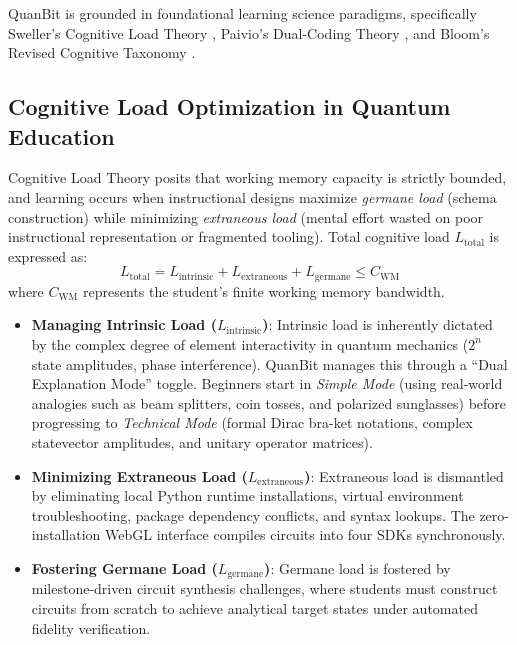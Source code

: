 \documentclass[conference]{IEEEtran}
\begin{document}
QuanBit is grounded in foundational learning science paradigms, specifically Sweller's Cognitive Load Theory \cite{b7}, Paivio's Dual-Coding Theory \cite{b12}, and Bloom's Revised Cognitive Taxonomy \cite{b13}.

\subsection{Cognitive Load Optimization in Quantum Education}
Cognitive Load Theory posits that working memory capacity is strictly bounded, and learning occurs when instructional designs maximize \textit{germane load} (schema construction) while minimizing \textit{extraneous load} (mental effort wasted on poor instructional representation or fragmented tooling). Total cognitive load $L_{\text{total}}$ is expressed as:
\begin{equation}
L_{\text{total}} = L_{\text{intrinsic}} + L_{\text{extraneous}} + L_{\text{germane}} \le C_{\text{WM}}
\end{equation}
where $C_{\text{WM}}$ represents the student's finite working memory bandwidth.
\begin{itemize}[leftmargin=*,itemsep=2pt]
    \item \textbf{Managing Intrinsic Load ($L_{\text{intrinsic}}$)}: Intrinsic load is inherently dictated by the complex degree of element interactivity in quantum mechanics ($2^n$ state amplitudes, phase interference). QuanBit manages this through a ``Dual Explanation Mode'' toggle. Beginners start in \textit{Simple Mode} (using real-world analogies such as beam splitters, coin tosses, and polarized sunglasses) before progressing to \textit{Technical Mode} (formal Dirac bra-ket notations, complex statevector amplitudes, and unitary operator matrices).
    \item \textbf{Minimizing Extraneous Load ($L_{\text{extraneous}}$)}: Extraneous load is dismantled by eliminating local Python runtime installations, virtual environment troubleshooting, package dependency conflicts, and syntax lookups. The zero-installation WebGL interface compiles circuits into four SDKs synchronously.
    \item \textbf{Fostering Germane Load ($L_{\text{germane}}$)}: Germane load is fostered by milestone-driven circuit synthesis challenges, where students must construct circuits from scratch to achieve analytical target states under automated fidelity verification.
\end{itemize}
\end{document}
